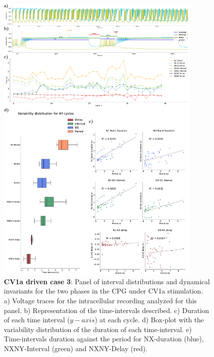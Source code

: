 \begin{figure}[htbp]
	\centering
	\includegraphics[width=0.9\textwidth]{./img/invariants/data/SUSSEX/CV1a_driven4/images/2phases/panel_with_intervals.pdf}
	\caption{\textbf{CV1a driven case 3}: Panel of interval distributions and dynamical invariants for the two phases in the CPG under CV1a stimulation. a) Voltage traces for the intracellular recording analyzed for this panel. b) Representation of the time-intervals described. c) Duration of each time interval ($y-axis$) at each cycle. d) Box-plot with the variability distribution of the duration of each time-interval. e) Time-intervals duration against the period for NX-duration (blue), NXNY-Interval (green) and NXNY-Delay (red).}
	\label{fig:cv1a 4 2phases}
\end{figure}





